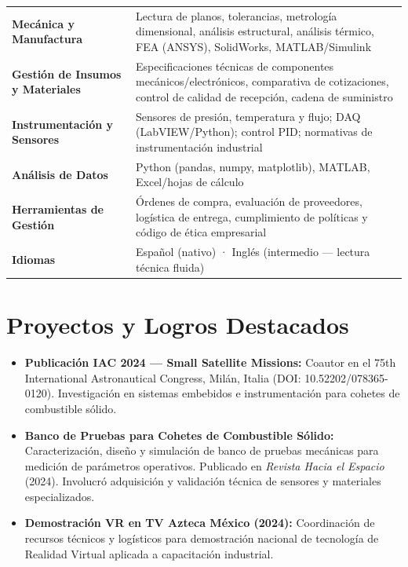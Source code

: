\documentclass[10pt, letterpaper]{article}
\begin{document}
\begin{tabularx}{\linewidth}{@{} >{\bfseries}p{5cm} X @{}}
  Mecánica y Manufactura &
    Lectura de planos, tolerancias, metrología dimensional, análisis estructural,
    análisis térmico, FEA (ANSYS), SolidWorks, MATLAB/Simulink \\[4pt]

  Gestión de Insumos y Materiales &
    Especificaciones técnicas de componentes mecánicos/electrónicos, comparativa de
    cotizaciones, control de calidad de recepción, cadena de suministro \\[4pt]

  Instrumentación y Sensores &
    Sensores de presión, temperatura y flujo; DAQ (LabVIEW/Python);
    control PID; normativas de instrumentación industrial \\[4pt]

  Análisis de Datos &
    Python (pandas, numpy, matplotlib), MATLAB, Excel/hojas de cálculo \\[4pt]

  Herramientas de Gestión &
    Órdenes de compra, evaluación de proveedores, logística de entrega,
    cumplimiento de políticas y código de ética empresarial \\[4pt]

  Idiomas &
    Español (nativo) · Inglés (intermedio — lectura técnica fluida) \\
\end{tabularx}

\section{Proyectos y Logros Destacados}

\begin{itemize}
  \item \textbf{Publicación IAC 2024 — Small Satellite Missions:}
        Coautor en el 75th International Astronautical Congress, Milán, Italia
        (DOI: 10.52202/078365-0120). Investigación en sistemas embebidos e instrumentación
        para cohetes de combustible sólido.
  \item \textbf{Banco de Pruebas para Cohetes de Combustible Sólido:}
        Caracterización, diseño y simulación de banco de pruebas mecánicas para medición
        de parámetros operativos. Publicado en \textit{Revista Hacia el Espacio} (2024).
        Involucró adquisición y validación técnica de sensores y materiales especializados.
  \item \textbf{Demostración VR en TV Azteca México (2024):}
        Coordinación de recursos técnicos y logísticos para demostración nacional de
        tecnología de Realidad Virtual aplicada a capacitación industrial.
\end{itemize}
\end{document}
